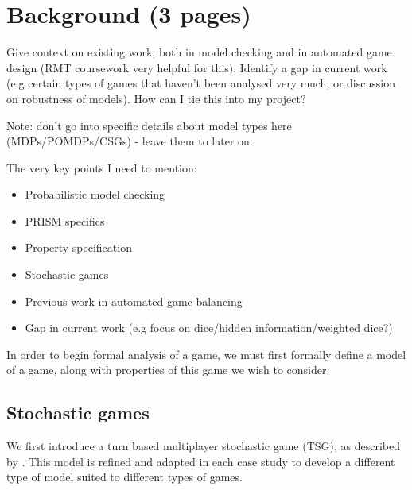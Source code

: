 
\chapter{Background (3 pages)}

Give context on existing work, both in model checking and in automated game design (RMT coursework very helpful for this). Identify a gap in current work (e.g certain types of games that haven't been analysed very much, or discussion on robustness of models). How can I tie this into my project?

Note: don't go into specific details about model types here (MDPs/POMDPs/CSGs) - leave them to later on.

The very key points I need to mention:

\begin{itemize}
    \item Probabilistic model checking
    \item PRISM specifics
    \item Property specification
    \item Stochastic games
    \item Previous work in automated game balancing
    \item Gap in current work (e.g focus on dice/hidden information/weighted dice?)
\end{itemize}

In order to begin formal analysis of a game, we must first formally define a model of a game, along with properties of this game we wish to consider.

\section{Stochastic games}

We first introduce a turn based multiplayer stochastic game (TSG), as described by \cite{kavanagh_balancing_2019}. This model is refined and adapted in each case study to develop a different type of model suited to different types of games.

